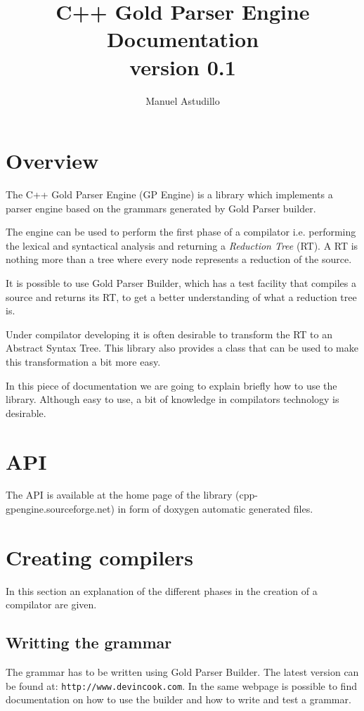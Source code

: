 \documentclass[a4paper]{article}
\title{C++ Gold Parser Engine Documentation\\
			version 0.1}
\author{Manuel Astudillo}
\begin{document}
\maketitle
\newpage

\section{Overview}
The C++ Gold Parser Engine (GP Engine) is a library which implements a parser engine based on 
the grammars generated by Gold Parser builder.

The engine can be used to perform the first phase of a compilator i.e. performing
the lexical and syntactical analysis and returning a \textit{Reduction Tree} (RT). A RT is nothing more than a tree where every node represents a reduction of the source. 

It is possible to use Gold Parser Builder, which has a test facility that compiles a source and returns its RT, to get a better understanding of what a reduction tree is.

Under compilator developing it is often desirable to transform the RT to an Abstract Syntax Tree. 
This library also provides a class that can be used to make this transformation a bit more easy.

In this piece of documentation we are going to explain briefly how to use the library. Although easy to use, a bit of knowledge in compilators technology is desirable.

\section{API}
The API is available at the home page of the library (cpp-gpengine.sourceforge.net) in form of doxygen automatic generated files.

\section{Creating compilers}

In this section an explanation of the different phases in the creation of a compilator are given.

\subsection {Writting the grammar}
The grammar has to be written using Gold Parser Builder. The latest version can be found at: \verb|http://www.devincook.com|.
In the same webpage is possible to find documentation on how to use the builder and how to write and test a grammar.
\end{document}
